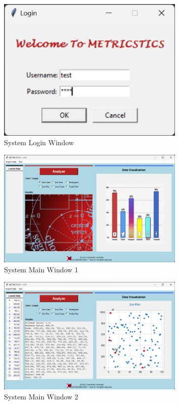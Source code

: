 \documentclass[english,12pt,a4paper]{report}
\begin{document}
		\begin{figure}[h]
			\centering
			\includegraphics[width=0.8\textwidth]{images/login.jpg}
			\caption{System Login Window}
			\label{fig:System Login Window}
		\end{figure}
		
		\begin{figure}[h]
			\centering
			\includegraphics[width=0.8\textwidth]{images/main.jpg}
			\caption{System Main Window 1}
			\label{fig:System Main Window}
		\end{figure}
		
		\begin{figure}[h]
			\centering
			\includegraphics[width=0.8\textwidth]{images/data.jpg}
			\caption{System Main Window 2}
			\label{fig:System Main Window 2}
		\end{figure}
		
\end{document}
